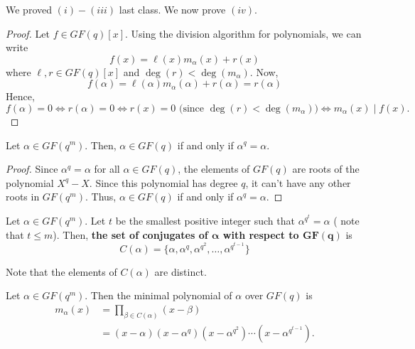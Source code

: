 We proved $ (i)-(iii) $ last class. We now prove $ (iv) $.
\begin{proof}
    Let $ f\in GF(q)[x] $. Using the division algorithm for polynomials,
    we can write
    \[ f(x)=\ell(x)m_\alpha(x)+r(x) \]
    where $ \ell,r\in GF(q)[x] $ and $ \deg(r)<\deg(m_\alpha) $. Now,
    \[ f(\alpha)=\ell(\alpha)m_\alpha(\alpha)+r(\alpha)=r(\alpha) \]
    Hence,
    \[ f(\alpha)=0\iff r(\alpha)=0\iff r(x)=0 \text{ (since }\deg(r)<\deg(m_\alpha)\text{)}\iff
    m_\alpha(x)\mid f(x). \]
\end{proof}

\begin{thmbox}
    \begin{theorem}
        Let $ \alpha\in GF(q^m) $. Then, $ \alpha\in GF(q) $ if and only if
        $ \alpha^q=\alpha $.
    \end{theorem}
\end{thmbox}

\begin{proof}
    Since $ \alpha^q=\alpha $ for all $ \alpha\in GF(q) $, the elements of $ GF(q) $
    are roots of the polynomial $ X^q-X $. Since this polynomial has degree $ q $,
    it can't have any other roots in $ GF(q^m) $. Thus, $ \alpha\in GF(q) $
    if and only if $ \alpha^q=\alpha $.
\end{proof}

\begin{defbox}
    \begin{definition}
        Let $ \alpha\in GF(q^m) $. Let $ t $ be the smallest positive integer such that
        $ \alpha^{q^t}=\alpha $ ( note that $ t\leqslant m $). Then,
        \textbf{the set of conjugates of $ \bm{\alpha} $ with respect to $ \bm{GF(q)} $} is
        \[ C(\alpha)=\{\alpha,\alpha^q,\alpha^{q^2},\ldots,\alpha^{q^{t-1}}\} \]

        Note that the elements of $ C(\alpha) $ are distinct.
    \end{definition}
\end{defbox}

\begin{thmbox}
    \begin{theorem}
        Let $ \alpha\in GF(q^m) $. Then the minimal polynomial of $ \alpha $ over
        $ GF(q) $ is
        \begin{align*}
            m_\alpha(x)
            &=\prod_{\beta\in C(\alpha)}(x-\beta)\\
            &=(x-\alpha)(x-\alpha^q)(x-\alpha^{q^2})\cdots(x-\alpha^{q^{t-1}}).
        \end{align*}
    \end{theorem}
\end{thmbox}

